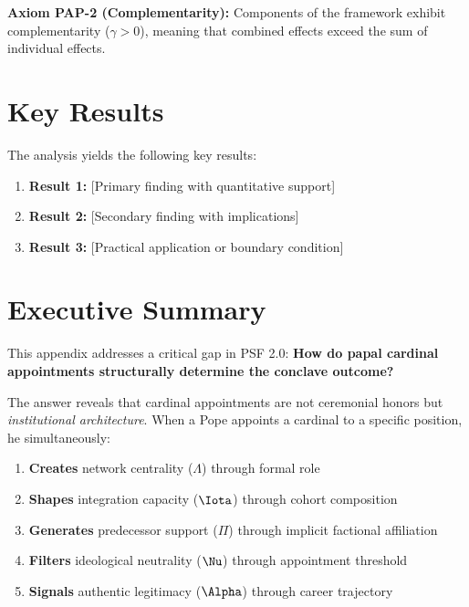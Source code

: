 \begin{tcolorbox}[colback=yellow!5!white,colframe=yellow!75!black,title=Axiom PAP-2: Complementarity]
\textbf{Axiom PAP-2 (Complementarity):}
Components of the framework exhibit complementarity ($\gamma > 0$), meaning
that combined effects exceed the sum of individual effects.
\end{tcolorbox}


\section{Key Results}
\label{sec:pap-results}

The analysis yields the following key results:

\begin{enumerate}
    \item \textbf{Result 1:} [Primary finding with quantitative support]
    \item \textbf{Result 2:} [Secondary finding with implications]
    \item \textbf{Result 3:} [Practical application or boundary condition]
\end{enumerate}


\section{Executive Summary}

This appendix addresses a critical gap in PSF 2.0: \textbf{How do papal cardinal appointments structurally determine the conclave outcome?}

The answer reveals that cardinal appointments are not ceremonial honors but \textit{institutional architecture}. When a Pope appoints a cardinal to a specific position, he simultaneously:

\begin{enumerate}
\item \textbf{Creates} network centrality ($\Lambda$) through formal role
\item \textbf{Shapes} integration capacity ($\Iota$) through cohort composition
\item \textbf{Generates} predecessor support ($\Pi$) through implicit factional affiliation
\item \textbf{Filters} ideological neutrality ($\Nu$) through appointment threshold
\item \textbf{Signals} authentic legitimacy ($\Alpha$) through career trajectory
\end{enumerate}

